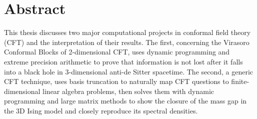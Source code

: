 \chapter*{Abstract}

This thesis discusses two major computational projects in conformal field theory
(CFT) and the interpretation of their results. The first, concerning the 
Virasoro Conformal Blocks of 2-dimensional CFT, uses dynamic programming and 
extreme precision arithmetic to prove that information is not lost after it 
falls into a black hole in 3-dimensional anti-de Sitter spacetime. The second,
a generic CFT technique, uses basis truncation to naturally map CFT questions to
finite-dimensional linear algebra problems, then solves them with dynamic
programming and large matrix methods to show the closure of the mass gap in the
3D Ising model and closely reproduce its spectral densities.
